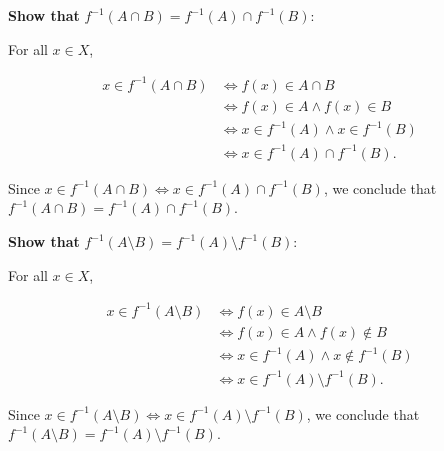 \documentclass[11pt]{article}
\begin{document}
\textbf{Show that} $f^{-1}(A \cap B) = f^{-1}(A) \cap f^{-1}(B)$:

For all $x \in X$,

$$
\begin{array}{rl}
x \in f^{-1}(A \cap B) &\iff f(x) \in A \cap B \\
&\iff f(x) \in A \land f(x) \in B \\
&\iff x \in f^{-1}(A) \land x \in f^{-1}(B) \\
&\iff x \in f^{-1}(A) \cap f^{-1}(B).
\end{array}
$$

Since $x \in f^{-1}(A \cap B) \iff x \in f^{-1}(A) \cap f^{-1}(B)$,
we conclude that $f^{-1}(A \cap B) = f^{-1}(A) \cap f^{-1}(B)$.


\textbf{Show that} $f^{-1}(A \setminus B) = f^{-1}(A) \setminus f^{-1}(B)$:

For all $x \in X$,

$$
\begin{array}{rl}
x \in f^{-1}(A \setminus B) &\iff f(x) \in A \setminus B \\
&\iff f(x) \in A \land f(x) \notin B \\
&\iff x \in f^{-1}(A) \land x \notin f^{-1}(B) \\
&\iff x \in f^{-1}(A) \setminus f^{-1}(B).
\end{array}
$$

Since $x \in f^{-1}(A \setminus B) \iff x \in f^{-1}(A) \setminus f^{-1}(B)$,
we conclude that $f^{-1}(A \setminus B) = f^{-1}(A) \setminus f^{-1}(B)$.
\end{document}
